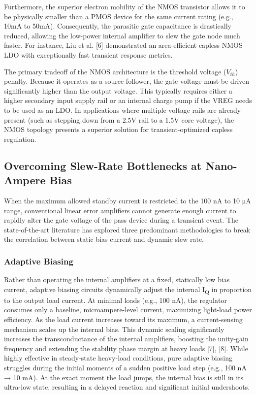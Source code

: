 \documentclass[
]{article}
\begin{document}
Furthermore, the superior electron mobility of the NMOS transistor
allows it to be physically smaller than a PMOS device for the same
current rating (e.g., 10mA to 50mA). Consequently, the parasitic gate
capacitance is drastically reduced, allowing the low-power internal
amplifier to slew the gate node much faster. For instance, Liu et al.
{[}6{]} demonstrated an area-efficient capless NMOS LDO with
exceptionally fast transient response metrics.

The primary tradeoff of the NMOS architecture is the threshold voltage
($V_{th}$) penalty. Because it operates as a source follower, the
gate voltage must be driven significantly higher than the output
voltage. This typically requires either a higher secondary input supply
rail or an internal charge pump if the VREG needs to be used as an LDO.
In applications where multiple voltage rails are already present (such
as stepping down from a 2.5V rail to a 1.5V core voltage), the NMOS
topology presents a superior solution for transient-optimized capless
regulation.

\subsection{Overcoming Slew-Rate Bottlenecks at Nano-Ampere
Bias}\label{_overcoming_slew_rate_bottlenecks_at_nano_ampere_bias}

When the maximum allowed standby current is restricted to the 100 nA to
10 μA range, conventional linear error amplifiers cannot generate enough
current to rapidly alter the gate voltage of the pass device during a
transient event. The state-of-the-art literature has explored three
predominant methodologies to break the correlation between static bias
current and dynamic slew rate.

\subsubsection{Adaptive Biasing}\label{_adaptive_biasing}

Rather than operating the internal amplifiers at a fixed, statically low
bias current, adaptive biasing circuits dynamically adjust the internal
I\textsubscript{Q} in proportion to the output load current. At minimal
loads (e.g., 100 nA), the regulator consumes only a baseline,
microampere-level current, maximizing light-load power efficiency. As
the load current increases toward its maximum, a current-sensing
mechanism scales up the internal bias. This dynamic scaling
significantly increases the transconductance of the internal amplifiers,
boosting the unity-gain frequency and extending the stability phase
margin at heavy loads {[}7{]}, {[}8{]}. While highly effective in
steady-state heavy-load conditions, pure adaptive biasing struggles
during the initial moments of a sudden positive load step (e.g., 100 nA
→ 10 mA). At the exact moment the load jumps, the internal bias is still
in its ultra-low state, resulting in a delayed reaction and significant
initial undershoots.
\end{document}
